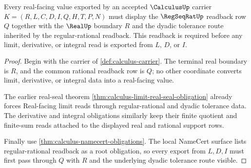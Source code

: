 \begin{theorem}
\label{thm:calculus-regseqrat-readback-root-obligation}
Every real-facing value exported by an accepted $\CalculusUp$ carrier $K=(R,L,C,D,I,Q,H,T,P,N)$ must display the $\RegSeqRatUp$ readback row $Q$ together with the $\RealUp$ boundary $R$ and the dyadic tolerance route inherited by the regular-rational readback. This readback is required before any limit, derivative, or integral read is exported from $L$, $D$, or $I$.
\end{theorem}
\begin{proof}
Begin with the carrier of \autoref{def:calculus-carrier}. The terminal real boundary is $R$, and the common rational readback row is $Q$; no other coordinate converts limit, derivative, or integral data into a real-facing value.

The earlier real-seal theorem \autoref{thm:calculus-limit-real-seal-obligation} already forces Real-facing limit reads through regular-rational and dyadic tolerance data. The derivative and integral obligations similarly keep their finite quotient and finite-sum reads attached to the displayed real and rational support rows.

Finally use \autoref{thm:calculus-namecert-obligations}. The local NameCert surface lists regular-rational readback as a root obligation, so every export from $L,D,I$ must first pass through $Q$ with $R$ and the underlying dyadic tolerance route visible.
\end{proof}

